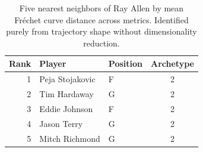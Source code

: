 \begin{table}[htbp]
  \centering\small
  \begin{tabular}{rllc}
    \toprule
    Rank & Player & Position & Archetype \\
    \midrule
    1 & Peja Stojakovic & F & 2 \\
    2 & Tim Hardaway & G & 2 \\
    3 & Eddie Johnson & F & 2 \\
    4 & Jason Terry & G & 2 \\
    5 & Mitch Richmond & G & 2 \\
    \bottomrule
  \end{tabular}
  \caption{Five nearest neighbors of Ray Allen by mean Fr\'{e}chet curve distance across metrics. Identified purely from trajectory shape without dimensionality reduction.}
  \label{tab:Ray_Allen_frechet_curve_neighbors}
\end{table}

